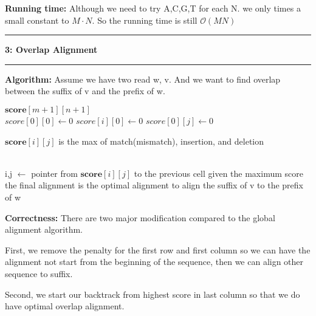 \documentclass[11pt]{article}
\newcommand\question[2]{\vspace{.25in}\hrule\textbf{#1: #2}\vspace{.5em}\hrule\vspace{.10in}}
\newcommand\algorithmcode{\vspace{.10in}\textbf{Algorithm: }}
\newcommand\correctness{\vspace{.10in}\textbf{Correctness: }}
\newcommand\runtime{\vspace{.10in}\textbf{Running time: }}
\begin{document}
\runtime Although we need to try A,C,G,T for each N. we only times a small constant to $ M\cdot N $. So the running time is still $ \mathcal{O}(MN) $

\question{3}{Overlap Alignment}

\algorithmcode Assume we have two read w, v. And we want to find overlap between the suffix of v and the prefix of w.


\begin{algorithmic}

	\State $\mathbf{score}[m+1][n+1]$ 
	\\
	\State $score[0][0] \gets 0$	
	\State$  score[i][0] \gets 0 $
	\EndFor
	\State$  score[0][j] \gets 0 $
	\EndFor
	\\

	\State $\mathbf{score}[i][j]$ is the max of match(mismatch), insertion, and deletion

	\EndFor
	\EndFor
	\\
	\State i,j $ \gets $ pointer from $ \mathbf{score}[i][j] $ to the previous cell given the maximum score
	\EndWhile
	\State the final alignment is the optimal alignment to align the suffix of v to the prefix of w
	
\end{algorithmic}

\correctness There are two major modification compared to the global alignment algorithm.

First, we remove the penalty for the first row and first column so we can have the alignment not start from the beginning of the sequence, then we can align other sequence to suffix.

Second, we start our backtrack from highest score in last column so that we do have optimal overlap alignment.
\end{document}
